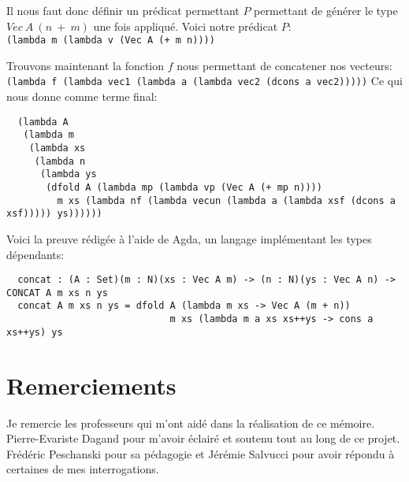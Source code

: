 \documentclass {article}
\theoremstyle{definition}
\theoremstyle{remark}
\newcommand{\fun}[1]{\lstinline!#1!}
\begin{document}
Il nous faut donc définir un prédicat permettant $P$ permettant de générer le type $Vec\:A\:(n\: +\: m)$
une fois appliqué.
Voici notre prédicat $P$: \\
\fun{(lambda m (lambda v (Vec A (+ m n))))}

Trouvons maintenant la fonction $f$ nous permettant de concatener nos vecteurs: \\
\fun{(lambda f (lambda vec1 (lambda a (lambda vec2 (dcons a vec2)))))}
Ce qui nous donne comme terme final: 

\begin{lstlisting} 
  (lambda A
   (lambda m
    (lambda xs
     (lambda n
      (lambda ys
       (dfold A (lambda mp (lambda vp (Vec A (+ mp n))))
         m xs (lambda nf (lambda vecun (lambda a (lambda xsf (dcons a xsf))))) ys))))))  
\end{lstlisting}

Voici la preuve rédigée à l'aide de Agda, un langage implémentant les types dépendants:
\begin{lstlisting}
  concat : (A : Set)(m : N)(xs : Vec A m) -> (n : N)(ys : Vec A n) -> CONCAT A m xs n ys
  concat A m xs n ys = dfold A (lambda m xs -> Vec A (m + n))
                             m xs (lambda m a xs xs++ys -> cons a xs++ys) ys 
\end{lstlisting}



\section*{Remerciements}

Je remercie les professeurs qui m'ont aidé dans la réalisation de ce mémoire.
Pierre-Evariste Dagand pour m'avoir éclairé et soutenu tout au long de ce projet.
Frédéric Peschanski pour sa pédagogie et 
Jérémie Salvucci pour avoir répondu à certaines de mes interrogations.




















\end{document}
